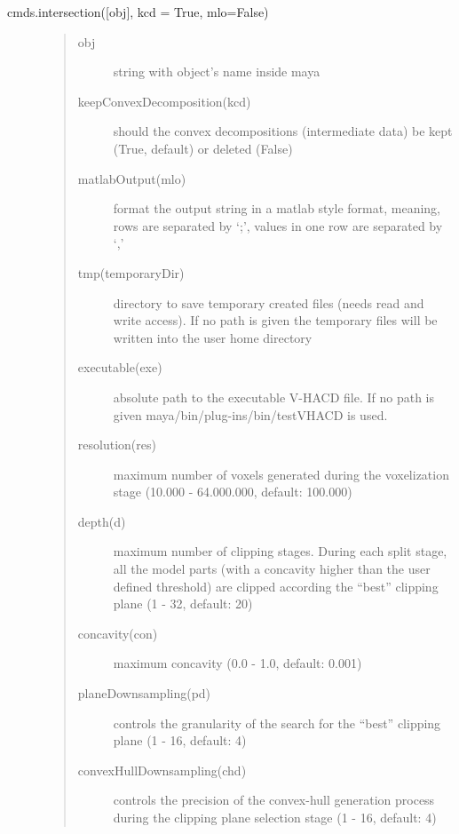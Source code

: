 \documentclass[letterpaper,10pt,english]{sphinxmanual}
\begin{document}
 cmds.intersection({[}obj{]}, kcd = True, mlo=False)
\begin{description}
\item[{}] \leavevmode\begin{quote}\begin{description}
\item[{obj}] \leavevmode
string with object’s name inside maya

\item[{keepConvexDecomposition(kcd)}] \leavevmode
should the convex decompositions (intermediate data) be kept (True, default) or deleted (False)

\item[{matlabOutput(mlo)}] \leavevmode
format the output string in a matlab style format, meaning, rows are separated by ‘;’, values in one row are separated by ‘,’

\item[{tmp(temporaryDir)}] \leavevmode
directory to save temporary created files (needs read and write access). If no path is given the temporary files will be written into the user home directory

\item[{executable(exe)}] \leavevmode
absolute path to the executable V-HACD file. If no path is given maya/bin/plug-ins/bin/testVHACD is used.

\item[{resolution(res)}] \leavevmode
maximum number of voxels generated during the voxelization stage (10.000 - 64.000.000, default: 100.000)

\item[{depth(d)}] \leavevmode
maximum number of clipping stages. During each split stage, all the model parts (with a concavity higher than the user defined threshold) are clipped according the “best” clipping plane (1 - 32, default: 20)

\item[{concavity(con)}] \leavevmode
maximum concavity (0.0 - 1.0, default: 0.001)

\item[{planeDownsampling(pd)}] \leavevmode
controls the granularity of the search for the “best” clipping plane (1 - 16, default: 4)

\item[{convexHullDownsampling(chd)}] \leavevmode
controls the precision of the convex-hull generation process during the clipping plane selection stage (1 - 16, default: 4)


\end{description}
\end{quote}
\end{description}
\end{document}
